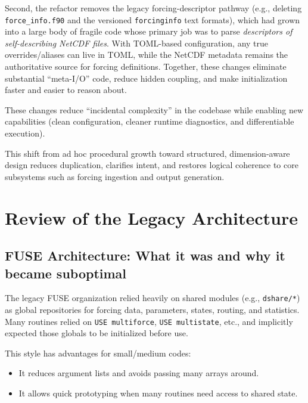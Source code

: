 \documentclass[11pt]{scrartcl}
\begin{document}
\begin{enumerate}
Second, the refactor removes the legacy forcing-descriptor pathway (e.g., deleting
\texttt{force\_info.f90} and the versioned \texttt{forcinginfo} text formats), which had grown
into a large body of fragile code whose primary job was to parse \emph{descriptors of
self-describing NetCDF files}. With TOML-based configuration, any true overrides/aliases can
live in TOML, while the NetCDF metadata remains the authoritative source for forcing
definitions. Together, these changes eliminate substantial ``meta-I/O'' code, reduce hidden
coupling, and make initialization faster and easier to reason about.

\end{enumerate}

These changes reduce ``incidental complexity'' in the codebase while enabling new
capabilities (clean configuration, cleaner runtime diagnostics, and differentiable execution).

This shift from ad hoc procedural growth toward structured, dimension-aware
design reduces duplication, clarifies intent, and restores logical coherence
to core subsystems such as forcing ingestion and output generation.


\section{Review of the Legacy Architecture}

\subsection{FUSE Architecture: What it was and why it became suboptimal}

The legacy FUSE organization relied heavily on shared modules (e.g., \texttt{dshare/*})
as global repositories for forcing data, parameters, states, routing, and statistics.
Many routines relied on \texttt{USE multiforce}, \texttt{USE multistate}, etc., and
implicitly expected those globals to be initialized before use.

This style has advantages for small/medium codes:
\begin{itemize}[leftmargin=*]
\item It reduces argument lists and avoids passing many arrays around.
\item It allows quick prototyping when many routines need access to shared state.
\end{itemize}
\end{document}
